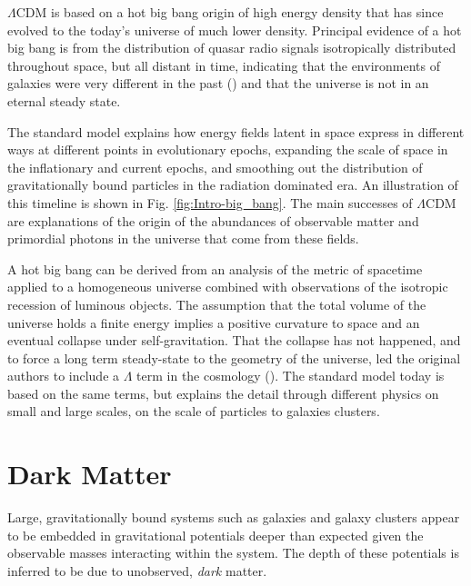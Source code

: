 \documentclass{paper}
\begin{document}
  $\Lambda$CDM is based on a hot big bang origin of high energy density 
  that has since evolved to the today's universe of much lower density. 
  Principal evidence of a hot big bang is from the distribution of quasar 
  radio signals isotropically distributed throughout space, but all distant
  in time, indicating that the environments of galaxies were very different
  in the past (\cite{Secrest_2021}) and that the universe is not in an
  eternal steady state. 

  The standard model explains how energy fields latent in space express in 
  different ways at different points in evolutionary epochs, expanding the 
  scale of space in the inflationary and current epochs, and smoothing out the 
  distribution of gravitationally bound particles in the radiation dominated 
  era. An illustration of this timeline is shown in Fig. 
  \ref{fig:Intro-big_bang}. The main successes of $\Lambda$CDM are 
  explanations of the origin of the abundances of observable matter and 
  primordial photons in the universe that come from these fields.

  A hot big bang can be derived from an analysis of the metric of spacetime 
  applied to a homogeneous universe combined with observations of the isotropic
  recession of luminous objects. The assumption that the total volume of 
  the universe holds a finite energy implies a positive curvature to space and
  an eventual collapse under self-gravitation. That the collapse has not 
  happened, and to force a long term steady-state to the geometry of the 
  universe, led the original authors to include a $\Lambda$ term in the 
  cosmology (\cite{10.1093/mnras/90.7.668}). The standard model today is based 
  on the same terms, but explains the detail through different physics on
  small and large scales, on the scale of particles to galaxies clusters.

\section{Dark Matter}
  Large, gravitationally bound systems such as galaxies and galaxy clusters 
  appear to be embedded in gravitational potentials deeper than expected given 
  the observable masses interacting within the system. The depth of these 
  potentials is inferred to be due to unobserved, \textit{dark} matter.
\end{document}
